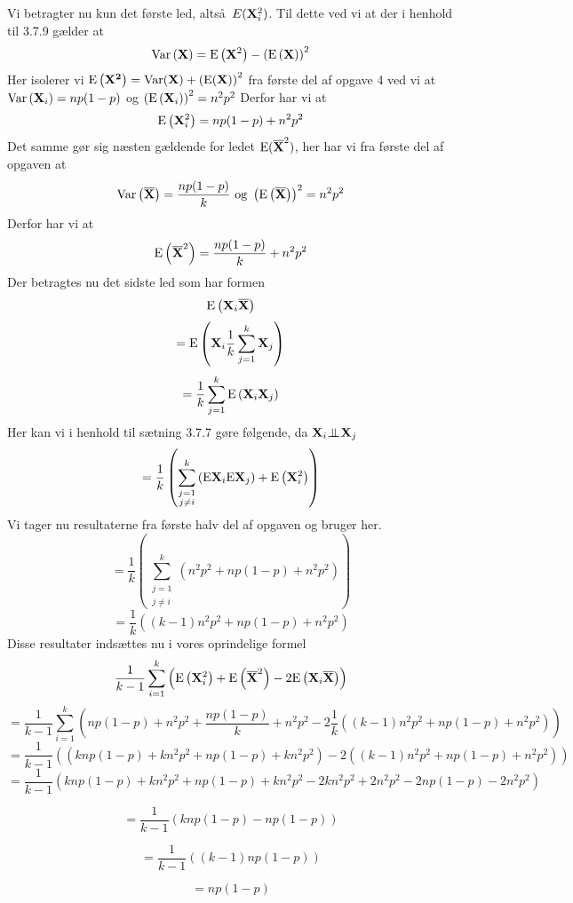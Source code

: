{Vi betragter nu kun det f\o rste led, alts\aa\ $E(\mathbf{X}_i^2)$. Til dette ved vi at der i henhold til 3.7.9 g\ae lder at
\[
\textrm{Var}\left(\mathbf{X}\right) = \textrm{E}\left( \mathbf{X}^2 \right) - \left( \textrm{E} \left( \mathbf{X} \right) \right)^2
\]
Her isolerer vi $\textrm{E}\left( \mathbf{X^2} \right) = \textrm{Var}(\mathbf{X}) + \left( \textrm{E} ( \mathbf{X} ) \right)^2$ fra f\o rste del af opgave 4 ved vi at $\textrm{Var}\left( \mathbf{X}_i \right) = np(1-p)$ og $\left(\textrm{E}\left(\mathbf{X}_i\right)\right)^2 = n^2p^2$
Derfor har vi at
\[
\textrm{E}\left( \mathbf{X}_{i}^{2} \right) = np(1-p) + n^2p^2
\]
Det samme g\o r sig n\ae sten g\ae ldende for ledet $\textrm{E}(\mathbf{\overline{X}}^{2} )$, her har vi fra f\o rste del af opgaven at
\[
\textrm{Var}\left(\mathbf{\overline{X}} \right) = \frac{np(1-p)}{k} \textrm{ og } \left(\textrm{E}\left(\mathbf{\overline{X}}\right)\right)^2 = n^2p^2
\]
Derfor har vi at
\[
\textrm{E}\left(\mathbf{\overline{X}}^{2} \right) = \frac{np(1-p)}{k} + n^2p^2
\]
Der betragtes nu det sidste led som har formen
\[
\textrm{E}\left( \mathbf{X}_i \mathbf{\overline{X}}\right)
\]
\[
= \textrm{E}\left( \mathbf{X}_i \frac{1}{k} \sum_{j = 1}^{k} \mathbf{X}_j \right)
\]
\[
= \frac{1}{k} \sum_{j = 1}^{k} \textrm{E}\left( \mathbf{X}_i \mathbf{X}_j \right)
\]
Her kan vi i henhold til s\ae tning 3.7.7 g\o re f\o lgende, da $\mathbf{X}_i {\;\bot\!\!\!\!\!\!\bot\;} \mathbf{X}_j$
\[
= \frac{1}{k} \left( \sum_{\substack{j = 1 \\ j \neq i}}^{k} \left( \textrm{E} \mathbf{X}_i \textrm{E} \mathbf{X}_j \right) + \textrm{E} \left( \mathbf{X}_{i}^{2} \right) \right)
\]
Vi tager nu resultaterne fra f\o rste halv del af opgaven og bruger her.
\[
= \frac{1}{k}\left( \sum_{\substack{j = 1 \\ j \neq i}}^{k} \left( n^2p^2 + np \left( 1 - p \right) + n^2p^2 \right) \right)
\]
\[
= \frac{1}{k} \left( \left(k-1 \right) n^2p^2 + np \left( 1 - p \right) + n^2p^2 \right)
\]
Disse resultater inds\ae ttes nu i vores oprindelige formel
\[
\frac{1}{k-1}\sum_{i=1}^{k}\left( \textrm{E}\left(\mathbf{X}_i^2\right) + \textrm{E}\left( \mathbf{\overline{X}}^2\right) - 2\textrm{E}\left(\mathbf{X}_i\mathbf{\overline{X}} \right) \right)
\]
\[
= \frac{1}{k-1}\sum_{i=1}^{k} \left( np(1-p)+n^2p^2 + \frac{np(1-p)}{k} + n^2p^2 - 2\frac{1}{k} \left( \left( k-1 \right) n^2p^2 + np \left( 1-p \right) + n^2p^2 \right) \right)
\]
\[
= \frac{1}{k-1} \left( \left( knp \left( 1-p \right) + kn^2p^2 + np(1-p) + kn^2p^2 \right) - 2 \left( \left( k-1 \right) n^2p^2 + np \left( 1-p \right) + n^2p^2\right) \right)
\]
\[
= \frac{1}{k-1} \left( knp \left( 1-p \right) + kn^2p^2  + np \left( 1-p \right) + kn^2p^2 - 2 kn^2p^2 +2n^2p^2 - 2np \left( 1-p \right)-2n^2p^2 \right)
\]

\[
= \frac{1}{k-1} \left( knp \left( 1-p \right) - np \left( 1-p \right) \right)
\]

\[
= \frac{1}{k-1} \left( \left( k-1 \right) np \left( 1-p \right) \right)
\]

\[
= np \left( 1-p \right)
\]
}

